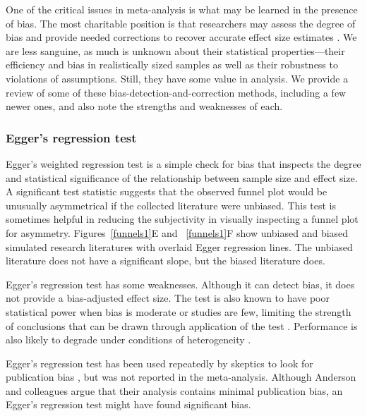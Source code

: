 \documentclass[man, mask]{apa6}
\begin{document}
One of the critical issues in meta-analysis is what may be learned in the presence of bias. The most charitable position is that researchers may assess the degree of bias and provide needed corrections to recover accurate effect size estimates \citep[e.g.,][]{Duval:Tweedie:2000,Simonsohn:etal:2014b}.  We are less sanguine, as much is unknown about their statistical properties---their efficiency and bias in realistically sized samples as well as their robustness to violations of assumptions.  Still, they have some value in analysis. We provide a review of some of these bias-detection-and-correction methods, including a few newer ones, and also note the strengths and weaknesses of each. 

\subsubsection{Egger's regression test}
Egger's weighted regression test \citep{Sterne:Egger:2005} is a simple check for bias that inspects the degree and statistical significance of the relationship between sample size and effect size. A significant test statistic suggests that the observed funnel plot would be unusually asymmetrical if the collected literature were unbiased. This test is sometimes helpful in reducing the subjectivity in visually inspecting a funnel plot for asymmetry. Figures~\ref{funnels1}E and ~\ref{funnels1}F show unbiased and biased simulated research literatures with overlaid Egger regression lines. The unbiased literature does not have a significant slope, but the biased literature does. 

Egger's regression test has some weaknesses. Although it can detect bias, it does not provide a bias-adjusted effect size. The test is also known to have poor statistical power when bias is moderate or studies are few, limiting the strength of conclusions that can be drawn through application of the test \citep{Sterne:etal:2000}. Performance is also likely to degrade under conditions of heterogeneity \citep[e.g.,][]{Terrin:etal:2003}. %

Egger's regression test has been used repeatedly by skeptics to look for publication bias \citep[e.g.,][]{Ferguson:2007,Ferguson:Kilburn:2009}, but was not reported in the \citet{Anderson:etal:2010} meta-analysis. Although Anderson and colleagues argue that their analysis contains minimal publication bias, an Egger's regression test might have found significant bias.
\end{document}
